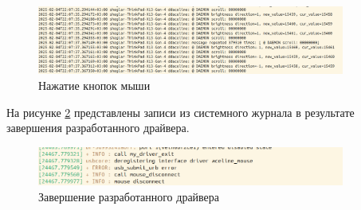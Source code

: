 \begin{figure}[!htb]\centering
	\includegraphics[width=0.9\textwidth]{../img/sys4.png}
	\caption{Нажатие кнопок мыши}
	\label{img:sys4}
\end{figure}

На рисунке \ref{img:sys5} представлены записи из системного журнала в результате завершения разработанного драйвера.

\begin{figure}[!htb]\centering
	\includegraphics[width=0.9\textwidth]{../img/sys5.png}
	\caption{Завершение разработанного драйвера}
	\label{img:sys5}
\end{figure}
